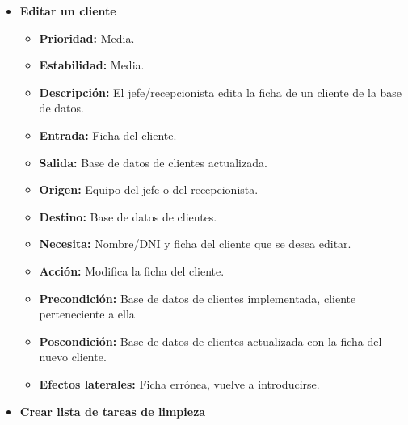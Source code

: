 \documentclass[spanish,a4paper,12pt]{report}		%
\begin{document}
\begin{itemize}
\begin{itemize}
		\end{itemize}%

		\item \textbf{Editar un cliente}  %

			\begin{itemize}
				\item \textbf{Prioridad: }Media.
				\item \textbf{Estabilidad: }Media.
				\item \textbf{Descripción: }El jefe/recepcionista edita la ficha de un cliente de la base de datos.
				\item \textbf{Entrada: } Ficha del cliente.
				\item \textbf{Salida: }Base de datos de clientes actualizada.
				\item \textbf{Origen: }Equipo del jefe o del recepcionista.
				\item \textbf{Destino: }Base de datos de clientes. 
				\item \textbf{Necesita: }Nombre/DNI y ficha del cliente que se desea editar. 
				\item \textbf{Acción: }Modifica la ficha del cliente.
				\item \textbf{Precondición: }Base de datos de clientes implementada, cliente perteneciente a ella
				\item \textbf{Poscondición: }Base de datos de clientes actualizada con la ficha del nuevo cliente. 
				\item \textbf{Efectos laterales: } Ficha errónea, vuelve a introducirse.

		\end{itemize}%





	\item \textbf{Crear lista de tareas de limpieza} %


\end{itemize}
\end{document}
